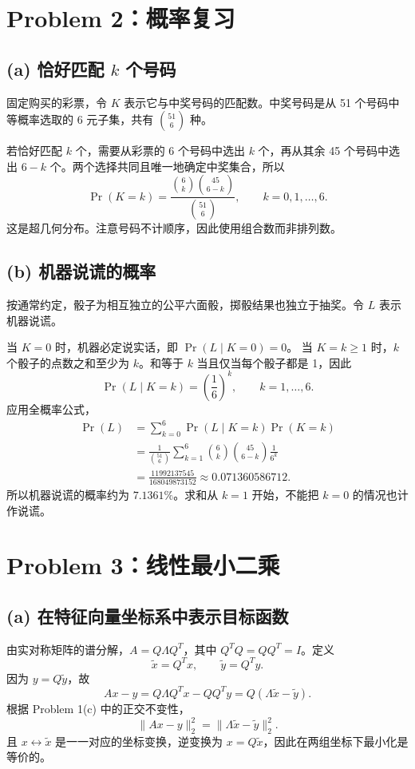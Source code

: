 \documentclass[11pt,UTF8,fontset=windows]{ctexart}
\begin{document}
\section*{Problem 2：概率复习}
\subsection*{(a) 恰好匹配 $k$ 个号码}
固定购买的彩票，令 $K$ 表示它与中奖号码的匹配数。中奖号码是从 51 个号码中等概率选取的 6 元子集，共有 $\binom{51}{6}$ 种。

若恰好匹配 $k$ 个，需要从彩票的 6 个号码中选出 $k$ 个，再从其余 45 个号码中选出 $6-k$ 个。两个选择共同且唯一地确定中奖集合，所以
\[
 \boxed{\Pr(K=k)=\frac{\binom{6}{k}\binom{45}{6-k}}{\binom{51}{6}},
 \qquad k=0,1,\ldots,6.}
\]
这是超几何分布。注意号码不计顺序，因此使用组合数而非排列数。
\subsection*{(b) 机器说谎的概率}
按通常约定，骰子为相互独立的公平六面骰，掷骰结果也独立于抽奖。令 $L$ 表示机器说谎。

当 $K=0$ 时，机器必定说实话，即 $\Pr(L\mid K=0)=0$。
当 $K=k\geq1$ 时，$k$ 个骰子的点数之和至少为 $k$。和等于 $k$ 当且仅当每个骰子都是 1，因此
\[
 \Pr(L\mid K=k)=\left(\frac16\right)^k,\qquad k=1,\ldots,6.
\]
应用全概率公式，
\begin{align*}
 \Pr(L)&=\sum_{k=0}^6\Pr(L\mid K=k)\Pr(K=k)\\
 &=\boxed{\frac{1}{\binom{51}{6}}
 \sum_{k=1}^6\binom{6}{k}\binom{45}{6-k}\frac{1}{6^k}}\\
 &=\frac{11992137545}{168049873152}
 \approx 0.071360586712.
\end{align*}
所以机器说谎的概率约为 $\boxed{7.1361\%}$。求和从 $k=1$ 开始，不能把 $k=0$ 的情况也计作说谎。
\newpage
\section*{Problem 3：线性最小二乘}
\subsection*{(a) 在特征向量坐标系中表示目标函数}
由实对称矩阵的谱分解，$A=Q\Lambda Q^T$，其中 $Q^TQ=QQ^T=I$。定义
\[\boxed{\widetilde x=Q^Tx,\qquad \widetilde y=Q^Ty}.\]
因为 $y=Q\widetilde y$，故
\[
 Ax-y=Q\Lambda Q^Tx-QQ^Ty=Q(\Lambda\widetilde x-\widetilde y).
\]
根据 Problem 1(c) 中的正交不变性，
\[\boxed{\|Ax-y\|_2^2=\|\Lambda\widetilde x-\widetilde y\|_2^2}.\]
且 $x\leftrightarrow\widetilde x$ 是一一对应的坐标变换，逆变换为 $x=Q\widetilde x$，因此在两组坐标下最小化是等价的。
\end{document}
